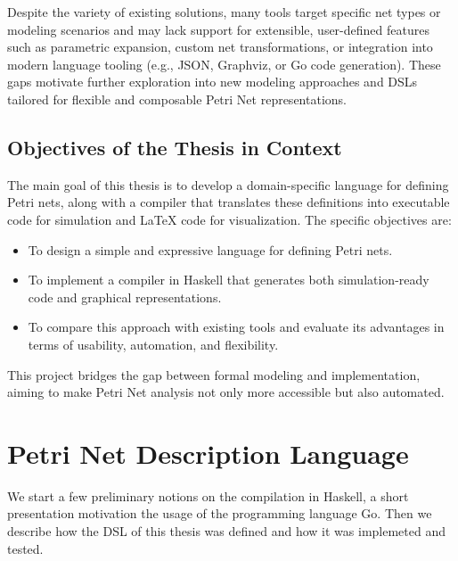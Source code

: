 \documentclass[12pt]{article}
\begin{document}
        Despite the variety of existing solutions, many tools target specific net types or modeling scenarios and may lack support for extensible, user-defined features such as parametric expansion, custom net transformations, or integration into modern language tooling (e.g., JSON, Graphviz, or Go code generation). These gaps motivate further exploration into new modeling approaches and DSLs tailored for flexible and composable Petri Net representations.


    \subsection{Objectives of the Thesis in Context}
    The main goal of this thesis is to develop a domain-specific language for defining Petri nets, along with a compiler that translates these definitions into executable code for simulation and LaTeX code for visualization. The specific objectives are:
    \begin{itemize}
        \item To design a simple and expressive language for defining Petri nets.
        \item To implement a compiler in Haskell that generates both simulation-ready code and graphical representations.
        \item To compare this approach with existing tools and evaluate its advantages in terms of usability, automation, and flexibility.
    \end{itemize}
    This project bridges the gap between formal modeling and implementation, aiming to make Petri Net analysis not only more accessible but also automated.
    
\section{Petri Net Description Language}
    We start a few preliminary notions on the compilation in Haskell, a short presentation motivation the usage of the programming language Go.
    Then we describe how the DSL of this thesis was defined and how it was implemeted and tested.
\end{document}
